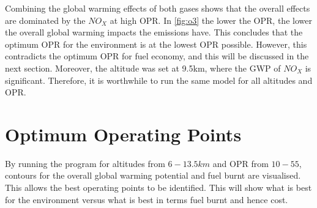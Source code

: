 \documentclass[12pt, a4paper]{article}
\begin{document}
Combining the global warming effects of both gases shows that the overall effects are dominated by the $NO_X$ at high OPR. In \autoref{fig:o3} the lower the OPR, the lower the overall global warming impacts the emissions have. This concludes that the optimum OPR for the environment is at the lowest OPR possible. However, this contradicts the optimum OPR for fuel economy, and this will be discussed in the next section. Moreover, the altitude was set at 9.5km, where the GWP of $NO_X$ is significant. Therefore, it is worthwhile to run the same model for all altitudes and OPR.

\section{Optimum Operating Points}
By running the program for altitudes from $6-13.5km$ and OPR from $10-55$, contours for the overall global warming potential and fuel burnt are visualised. This allows the best operating points to be identified. This will show what is best for the environment versus what is best in terms fuel burnt and hence cost.
\end{document}
